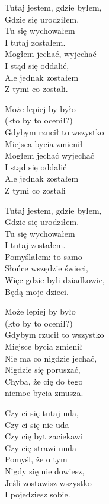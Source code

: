 \begin{text}
    Tutaj jestem, gdzie byłem,\\
    Gdzie się urodziłem.\\
    Tu się wychowałem\\
    I tutaj zostałem.\\
    Mogłem jechać, wyjechać\\
    I stąd się oddalić,\\
    Ale jednak zostałem\\
    Z tymi co zostali.

    \vin Może lepiej by było\\
    \vin (kto by to ocenił?)\\
    \vin Gdybym rzucił to wszystko\\
    \vin Miejsca bycia zmienił\\
    \vin Mogłem jechać wyjechać\\
    \vin I stąd się oddalić\\
    \vin Ale jednak zostałem\\
    \vin Z tymi co zostali

    Tutaj jestem, gdzie byłem,\\
    Gdzie się urodziłem.\\
    Tu się wychowałem\\
    I tutaj zostałem.\\
    Pomyślałem: to samo\\
    Słońce wszędzie świeci,\\
    Więc gdzie byli dziadkowie,\\
    Będą moje dzieci.

    \vin Może lepiej by było\\
    \vin (kto by to ocenił?)\\
    \vin Gdybym rzucił to wszystko\\
    \vin Miejsce bycia zmienił\\
    \vin Nie ma co nigdzie jechać,\\
    \vin Nigdzie się poruszać,\\
    \vin Chyba, że cię do tego\\
    \vin niemoc bycia zmusza.

    Czy ci się tutaj uda,\\
    Czy ci się nie uda\\
    Czy cię byt zaciekawi\\
    Czy cię strawi nuda –\\
    Pomyśl, że o tym\\
    Nigdy się nie dowiesz,\\
    Jeśli zostawisz wszystko\\
    I pojedziesz sobie.


\end{text}
